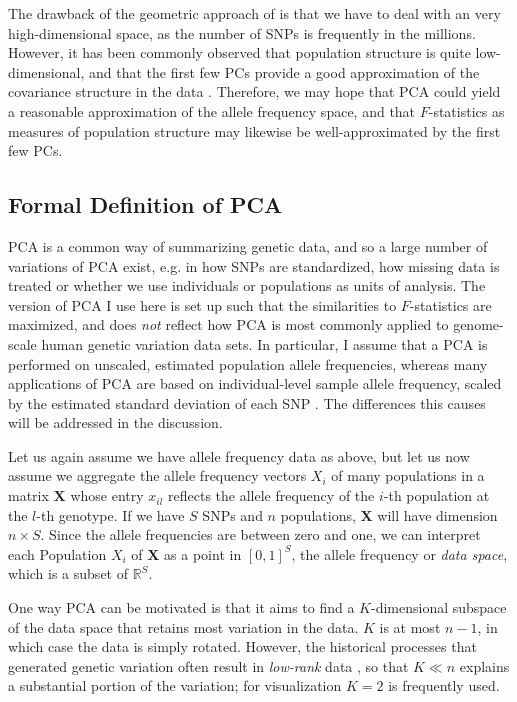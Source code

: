 \documentclass[12pt,fullpage, a4paper]{article}
\newcommand{\MX}{\mathbf{X}} %
\begin{document}
The drawback of the geometric approach of \cite{oteo-garcia2021} is that we have to deal with an very high-dimensional space, as the number of SNPs is frequently in the millions. However, it has been commonly observed that population structure is quite low-dimensional, and that the first few PCs provide a good approximation of the covariance structure in the data \citep{patterson2006}. Therefore, we may hope that PCA could yield a reasonable approximation of the allele frequency space, and that $F$-statistics as measures of population structure may likewise be well-approximated by the first few PCs.





\subsection{Formal Definition of PCA}
PCA is a common way of summarizing genetic data, and so a large number of variations of PCA exist, e.g. in how SNPs are standardized, how missing data is treated or whether we use individuals or populations as units of analysis. The version of PCA I use here is set up such that the similarities to  $F$-statistics are maximized, and does \emph{not} reflect how PCA is most commonly applied to genome-scale human genetic variation data sets. In particular, I assume that a PCA is performed on unscaled, estimated population allele frequencies, whereas many applications of PCA are based on individual-level sample allele frequency, scaled by the estimated standard deviation of each SNP \citep{patterson2006}. The differences this causes will be addressed in the discussion.

Let us again assume we have allele frequency data as above, but let us now assume we aggregate the allele frequency vectors $X_i$ of many populations in a matrix $\MX$ whose entry $x_{il}$ reflects the allele frequency of the $i$-th population at the $l$-th genotype. If we have $S$ SNPs and $n$ populations, $\MX$ will have dimension $n \times S$. Since the allele frequencies are between zero and one, we can interpret each Population $X_i$
of $\MX$ as a point in $[0, 1]^S$, the allele frequency or \emph{data space}, which is a subset of $\mathbb{R}^S$.
	
One way PCA can be motivated is that it aims to find a $K$-dimensional subspace of the data space that retains most  variation in the data. $K$ is at most $n-1$, in which case the data is simply rotated. However, the  historical processes that generated genetic variation often result in \emph{low-rank} data \citep{engelhardt2010}, so that $K \ll n$ explains a substantial portion of the variation; for visualization $K=2$ is frequently used. 
		
\end{document}
